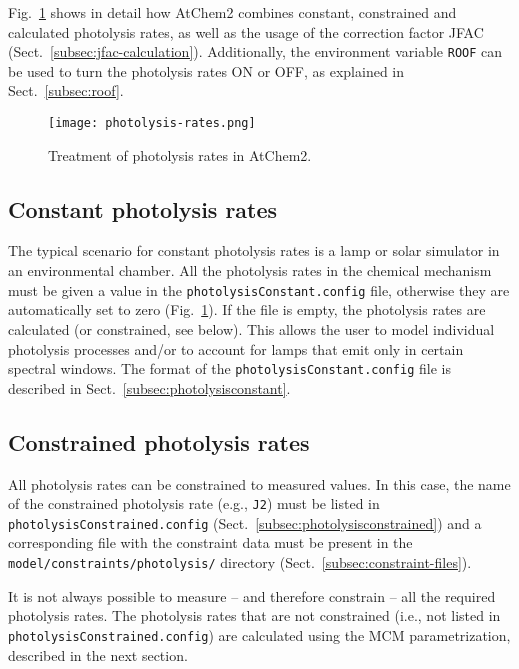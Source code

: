 Fig.~\ref{fig:photol} shows in detail how AtChem2 combines constant,
constrained and calculated photolysis rates, as well as the usage of
the correction factor JFAC (Sect.~\ref{subsec:jfac-calculation}).
Additionally, the environment variable \texttt{ROOF} can be used to
turn the photolysis rates ON or OFF, as explained in
Sect.~\ref{subsec:roof}.

\begin{figure}[htb]
  \centering
  \texttt{[image: photolysis-rates.png]}
  \caption{Treatment of photolysis rates in AtChem2.} \label{fig:photol}
\end{figure}

\subsection{Constant photolysis rates} \label{subsec:constant-photolysis-rates}

The typical scenario for constant photolysis rates is a lamp or solar
simulator in an environmental chamber. All the photolysis rates in the
chemical mechanism must be given a value in the
\texttt{photolysisConstant.config} file, otherwise they are
automatically set to zero (Fig.~\ref{fig:photol}). If the file is
empty, the photolysis rates are calculated (or constrained, see
below). This allows the user to model individual photolysis processes
and/or to account for lamps that emit only in certain spectral
windows. The format of the \texttt{photolysisConstant.config} file is
described in Sect.~\ref{subsec:photolysisconstant}.

\subsection{Constrained photolysis rates} \label{subsec:constrained-photolysis-rates}

All photolysis rates can be constrained to measured values. In this
case, the name of the constrained photolysis rate (e.g., \texttt{J2})
must be listed in \texttt{photolysisConstrained.config}
(Sect.~\ref{subsec:photolysisconstrained}) and a corresponding file
with the constraint data must be present in the
\texttt{model/constraints/photolysis/} directory
(Sect.~\ref{subsec:constraint-files}).                            

It is not always possible to measure -- and therefore constrain -- all
the required photolysis rates. The photolysis rates that are not
constrained (i.e., not listed in \texttt{photolysisConstrained.config})
are calculated using the MCM parametrization, described in the next
section.

